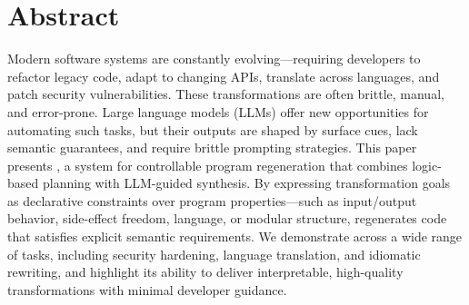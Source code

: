 \section*{Abstract}

Modern software systems are constantly evolving—requiring developers to
  refactor legacy code, adapt to changing APIs, translate across languages, and
  patch security vulnerabilities. These transformations are often brittle,
  manual, and error-prone. Large language models (LLMs) offer new opportunities
  for automating such tasks, but their outputs are shaped by surface cues, lack
  semantic guarantees, and require brittle prompting strategies. This paper
  presents \sys, a system for controllable program regeneration that combines
  logic-based planning with LLM-guided synthesis.
  By expressing transformation
  goals as declarative constraints over program properties---such as input/output
  behavior, side-effect freedom, language, or modular structure, \sys
  regenerates code that satisfies explicit semantic requirements.
  We demonstrate \sys across a wide range of tasks, including security
  hardening, language translation, and idiomatic rewriting, and highlight its
  ability to deliver interpretable, high-quality transformations with minimal
  developer guidance.
